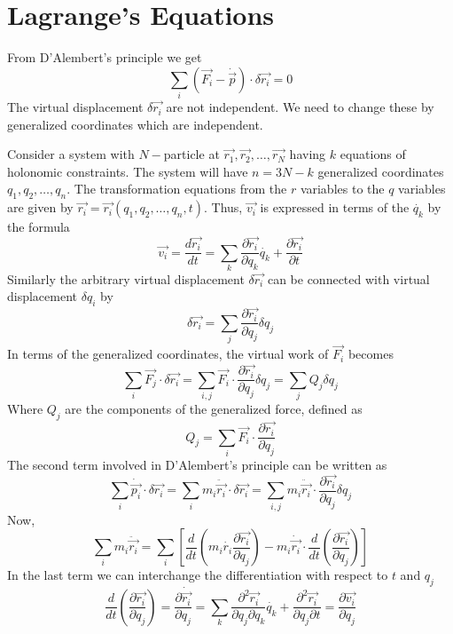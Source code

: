 \documentclass[12pt]{article}
\begin{document}
\section{Lagrange's Equations}
From D'Alembert's principle we get 
\begin{equation}
    \sum_i \left( \vec{F_i}-\dot{\vec{p}} \right)\cdot\delta \vec{r_i}=0\label{eq:lag1}
\end{equation}
The virtual displacement \(\delta \vec{r_i}\) are not independent. We need to change these by generalized coordinates which are independent.

Consider a system with \(N-\)particle at \(\vec{r_1},\vec{r_2},\dots,\vec{r_N}\) having \(k\) equations of holonomic constraints. The system will have \(n=3N-k\) generalized coordinates \(q_1,q_2,\dots,q_n\). The transformation equations from the \(r\) variables to the \(q\) variables are given by \(\vec{r_i}=\vec{r_i}(q_1,q_2,\dots,q_n,t)\). Thus, \(\vec{v_i}\) is expressed in terms of the \(\dot{q_k}\) by the formula 
\[
    \vec{v_i}=\frac{d\vec{r_i}}{dt}=\sum_k\frac{\partial \vec{r_i}}{\partial q_k}\dot{q_k}+\frac{\partial \vec{r_i}}{\partial t}
\]
Similarly the arbitrary virtual displacement \(\delta \vec{r_i}\) can be connected with virtual displacement \(\delta q_i\) by 
\[
    \delta \vec{r_i}=\sum_j \frac{\partial \vec{r_i}}{\partial q_j}\delta q_j
\]
In terms of the generalized coordinates, the virtual work of \(\vec{F_i}\) becomes 
\[
    \sum_i \vec{F_j}\cdot \delta \vec{r_i}=\sum_{i,j} \vec{F_i}\cdot\frac{\partial \vec{r_i}}{\partial q_j}\delta q_j=\sum_j Q_j \delta q_j
\]
Where \(Q_j\) are the components of the generalized force, defined as
\[
    Q_j=\sum_i \vec{F_i}\cdot \frac{\partial\vec{r_i}}{\partial q_j}
\]
The second term involved in D'Alembert's principle can be written as 
\[
    \sum_i \dot{\vec{p_i}}\cdot\delta \vec{r_i}=\sum_i m_i\ddot{\vec{r_i}}\cdot\delta \vec{r_i}=\sum_{i,j} m_i\ddot{\vec{r_i}}\cdot \frac{\partial \vec{r_i}}{\partial q_j} \delta q_j
\]
Now,
\[
    \sum_i m_i\ddot{\vec{r_i}}=\sum_i\left[ \frac{d}{dt}\left( m_i\dot{r_i}\frac{\partial \vec{r_i}}{\partial q_j} \right)-m_i\dot{\vec{r_i}}\cdot\frac{d}{dt}\left( \frac{\partial \vec{r_i}}{\partial q_j} \right) \right]
\]
In the last term we can interchange the differentiation with respect to \(t\) and \(q_j\)
\[
    \frac{d}{dt} \left( \frac{\partial \vec{r_i}}{\partial q_j} \right)=
    \frac{\partial \dot{\vec{r_i}}}{\partial q_j}=
    \sum_k \frac{\partial^2 \vec{r_i}}{\partial q_j \partial q_k}\dot{q_k}+\frac{\partial^2\vec{r_i}}{\partial q_j \partial t}=\frac{\partial \vec{v_i}}{\partial q_j}
\]
\end{document}
